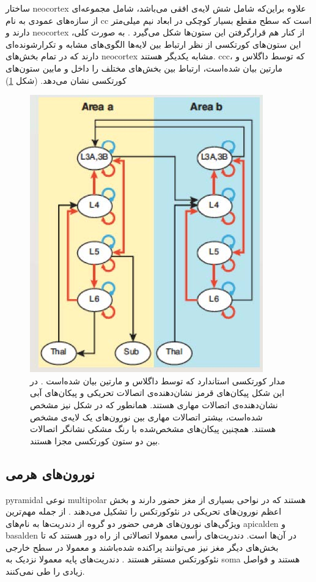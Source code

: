 \documentclass[12pt]{report}
\begin{document}
	ساختار \gls{neocortex} علاوه براین‌که شامل شش لایه‌ی افقی می‌باشد، شامل مجموعه‌ای از سازه‌های عمودی به نام \gls{cc} است که سطح مقطع بسیار کوچکی در ابعاد نیم میلی‌متر دارند و \gls{neocortex} از کنار‌ هم قرار‌گرفتن این ستون‌ها شکل می‌گیرد
	\cite{Horton2005}.
	به صورت کلی، این ستون‌های کورتکسی از نظر ارتباط بین لایه‌ها الگوی‌های مشابه و تکرار‌شونده‌ای دارند که در تمام بخش‌های \gls{neocortex} مشابه یکدیگر هستند. \gls{ccc}، که توسط داگلاس و مارتین 
	\cite{Douglas2004}
	بیان شده‌است، ارتباط بین بخش‌های مختلف را داخل و مابین ستون‌های کورتکسی نشان می‌دهد.
	(شکل \ref{fig:cc-doganmart})
	
	\begin{figure}[H]
		\centering
		\includegraphics[width=0.5\linewidth]{cc-con.jpg}
		\caption[NS]{
			مدار کورتکسی استاندارد که توسط داگلاس و مارتین بیان شده‌است
			\cite{Douglas2004}.
			در این شکل پیکان‌های قرمز نشان‌دهنده‌ی اتصالات تحریکی و پیکان‌های آبی نشان‌دهنده‌ی اتصالات مهاری هستند. همانطور که در شکل نیز مشخص شده‌است، بیشتر اتصالات مهاری بین نورون‌های یک لایه‌ی مشخص هستند. همچنین پیکان‌های مشخص‌شده با رنگ مشکی نشانگر اتصالات بین دو ستون کورتکسی مجزا هستند.
		}
		\label{fig:cc-doganmart}
	\end{figure}
	
	
	\subsection{نورون‌های هرمی}
	
	\gls{pyramidal} نوعی \gls{multipolar} هستند که در نواحی بسیاری از مغز حضور دارند و بخش اعظم نورون‌های تحریکی در نئوکورتکس را تشکیل می‌دهند \cite{Hawkins2016}.
	از جمله مهم‌ترین ویژگی‌های نورون‌های هرمی حضور دو گروه از دندریت‌ها به نام‌های \gls{apicalden} و \gls{basalden} در آن‌ها است.
	دندریت‌های رأسی معمولا اتصالاتی از راه دور هستند که تا بخش‌های دیگر مغز نیز می‌توانند پراکنده شده‌باشند و معمولا در سطح خارجی نئوکورتکس مستقر هستند \cite{MEGIAS2001527}. دندریت‌‌های پایه معمولا نزدیک به \gls{soma} هستند و فواصل زیادی را طی نمی‌کنند.
	
\end{document}
